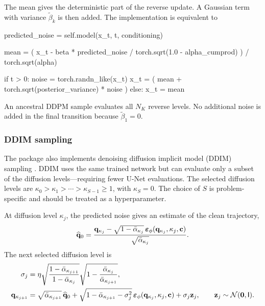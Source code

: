The mean gives the deterministic part of the reverse update. A Gaussian term
with variance $\widetilde{\beta}_k$ is then added. The implementation is
equivalent to

\begin{pythonlisting}
predicted_noise = self.model(x_t, t, conditioning)

mean = ( x_t - beta * predicted_noise / torch.sqrt(1.0 - alpha_cumprod) ) / torch.sqrt(alpha)

if t > 0:
    noise = torch.randn_like(x_t)
    x_t = ( mean + torch.sqrt(posterior_variance) * noise )
else:
    x_t = mean
\end{pythonlisting}

An ancestral DDPM sample evaluates all $N_K$ reverse levels. No additional noise is added in the final transition because $\widetilde{\beta}_1=0$.

\subsubsection{DDIM sampling}

The package also implements denoising diffusion implicit model (DDIM) sampling \cite{song2021ddim}. DDIM uses the same trained network but can evaluate only a subset of the diffusion levels---requiring fewer U-Net evaluations. The selected diffusion levels are $\kappa_0 > \kappa_1 > \cdots > \kappa_{S-1} \geq1$, with $\kappa_S=0$. The choice of $S$ is problem-specific and should be treated as a hyperparameter. 

At diffusion level $\kappa_j$, the predicted noise gives an estimate of the clean trajectory,
\begin{equation}
    \widehat{\mathbf{q}}_0
    =
    \frac{
        \mathbf{q}_{\kappa_j}
        -
        \sqrt{
            1-\bar{\alpha}_{\kappa_j}
        }\,
        \boldsymbol{\varepsilon}_\phi
        (
            \mathbf{q}_{\kappa_j},
            \kappa_j,
            \mathbf{c}
        )
    }{
        \sqrt{\bar{\alpha}_{\kappa_j}}
    }.
    \label{eq:ddim_q0}
\end{equation}
The next selected diffusion level is
\begin{align}
    \sigma_j
    &=
    \eta
    \sqrt{
        \frac{
            1-\bar{\alpha}_{\kappa_{j+1}}
        }{
            1-\bar{\alpha}_{\kappa_j}
        }
    }
    \sqrt{
        1-
        \frac{
            \bar{\alpha}_{\kappa_j}
        }{
            \bar{\alpha}_{\kappa_{j+1}}
        }
    },
    \label{eq:ddim_sigma}
    \\
    \mathbf{q}_{\kappa_{j+1}}
    &=
    \sqrt{
        \bar{\alpha}_{\kappa_{j+1}}
    }\,
    \widehat{\mathbf{q}}_0
    +
    \sqrt{
        1
        -
        \bar{\alpha}_{\kappa_{j+1}}
        -
        \sigma_j^2
    }\,
    \boldsymbol{\varepsilon}_\phi
    (
        \mathbf{q}_{\kappa_j},
        \kappa_j,
        \mathbf{c}
    )
    +
    \sigma_j\mathbf{z}_j,
    \qquad
    \mathbf{z}_j
    \sim
    \mathcal{N}(\mathbf{0},\mathsf{I}).
    \label{eq:ddim_update}
\end{align}

